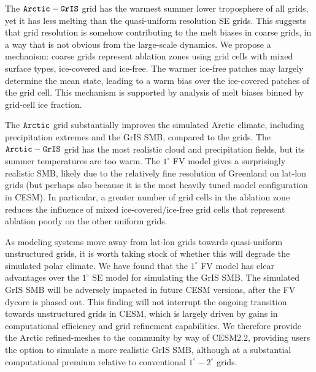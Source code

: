 \documentclass[draft]{agujournal2019}
\begin{document}
The $\tt Arctic-GrIS$ grid has the warmest summer lower troposphere of all grids, yet it has less melting than the quasi-uniform resolution SE grids. This suggests that grid resolution is somehow contributing to the melt biases in coarse grids, in a way that is not obvious from the large-scale dynamics. We propose a mechanism: coarse grids represent ablation zones using grid cells with mixed surface types, ice-covered and ice-free. The warmer ice-free patches may largely determine the mean state, leading to a warm bias over the ice-covered patches of the grid cell. This mechanism is supported by analysis of melt biases binned by grid-cell ice fraction.

The $\tt Arctic$ grid substantially improves the simulated Arctic climate, including precipitation extremes and the GrIS SMB, compared to the {} grids. The $\tt Arctic-GrIS$ grid has the most realistic cloud and precipitation fields, but its summer temperatures are too warm. The $1^{\circ}$ FV model gives a surprisingly realistic SMB, likely due to the relatively fine resolution of Greenland on lat-lon grids (but perhaps also because it is the most heavily tuned model configuration in CESM). In particular, a greater number of grid cells in the ablation zone reduces the influence of mixed ice-covered/ice-free grid cells that represent ablation poorly on the other {\color{blue}{lat-lon and quasi-}}uniform grids.

As modeling systems move away from lat-lon grids towards quasi-uniform unstructured grids, it is worth taking stock of whether this will degrade the simulated polar climate. We have found that the $1^{\circ}$ FV model has clear advantages over the $1^{\circ}$ SE model for simulating the GrIS SMB. {} The simulated GrIS SMB will be adversely impacted in future CESM versions, after the FV dycore is phased out. This finding will not interrupt the ongoing transition towards unstructured grids in CESM, which is largely driven by gains in computational efficiency and grid refinement capabilities. We therefore provide the Arctic refined-meshes to the community by way of CESM2.2, providing users the option to simulate a more realistic GrIS SMB, although at a substantial computational premium relative to conventional $1^{\circ}-2^{\circ}$ grids.
\end{document}
